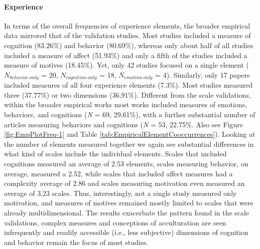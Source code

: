\paragraph{Experience}

In terms of the overall frequencies of experience elements, the broader
empirical data mirrored that of the validation studies. Most studies
included a measure of cognition (83.26\%) and behavior (80.69\%),
whereas only about half of all studies included a measure of affect
(51.93\%) and only a fifth of the studies included a measure of motives
(18.45\%). Yet, only 42 studies focused on a single element
(\(N_{behavior\ only}\) = 20, \(N_{cognition\ only}\) = 18,
\(N_{emotion\ only}\) = 4). Similarly, only 17 papers included measures
of all four experience elements (7.3\%). Most studies measured three
(37.77\%) or two dimensions (36.91\%). Different from the scale
validations, within the broader empirical works most works included
measures of emotions, behaviors, and cognitions (\textit{N} = 69,
29.61\%), with a further substantial number of articles measuring
behaviors and cognitions (\textit{N} = 53, 22.75\%. Also see Figure
\ref{fig:EmpPlotFreq-1} and Table
\ref{tab:EmpiricalElementCooccurrences}). Looking at the number of
elements measured together we again see substantial differences in what
kind of scales include the individual elements. Scales that included
cognitions measured an average of 2.53 elements, scales measuring
behavior, on average, measured a 2.52, while scales that included affect
measures had a complexity average of 2.86 and scales measuring
motivation even measured an average of 3.23 scales. Thus, interestingly,
not a single study measured only motivation, and measures of motives
remained mostly limited to scales that were already multidimensional.
The results exacerbate the pattern found in the scale validations,
complex measures and conceptions of acculturation are seen infrequently
and readily accessible (i.e., less subjective) dimensions of cognition
and behavior remain the focus of most studies.


